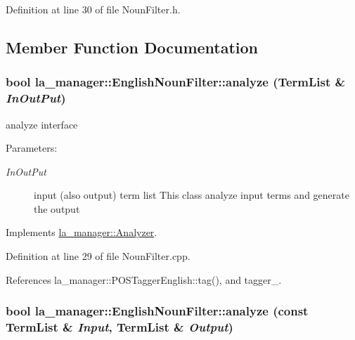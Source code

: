 Definition at line 30 of file NounFilter.h.

\subsection{Member Function Documentation}
\hypertarget{classla__manager_1_1EnglishNounFilter_a74c3ab1bb4af5b8e3f4693e4181c213}{
\subsubsection[{analyze}]{\setlength{\rightskip}{0pt plus 5cm}bool la\_\-manager::EnglishNounFilter::analyze ({\bf TermList} \& {\em InOutPut})}}
\label{classla__manager_1_1EnglishNounFilter_a74c3ab1bb4af5b8e3f4693e4181c213}


analyze interface 

\begin{Desc}
\item[Parameters:]
\begin{description}
\item[{\em InOutPut}]input (also output) term list This class analyze input terms and generate the output \end{description}
\end{Desc}


Implements \hyperlink{classla__manager_1_1Analyzer_23414b773ec2070957e9aa3d6a7d8b78}{la\_\-manager::Analyzer}.

Definition at line 29 of file NounFilter.cpp.

References la\_\-manager::POSTaggerEnglish::tag(), and tagger\_\-.\hypertarget{classla__manager_1_1EnglishNounFilter_8d45f1cdea331de42838fcf89de9c576}{
\subsubsection[{analyze}]{\setlength{\rightskip}{0pt plus 5cm}bool la\_\-manager::EnglishNounFilter::analyze (const {\bf TermList} \& {\em Input}, \/  {\bf TermList} \& {\em Output})}}
\label{classla__manager_1_1EnglishNounFilter_8d45f1cdea331de42838fcf89de9c576}


